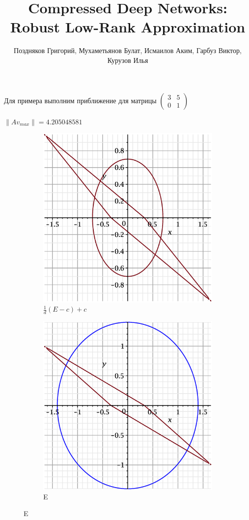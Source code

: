 \documentclass{beamer}
\title{Compressed Deep Networks: Robust Low-Rank Approximation}
\author{Поздняков Григорий, Мухаметьянов Булат, Исмаилов Аким, Гарбуз Виктор, Курузов Илья}
\begin{document}

\begin{frame}%
\titlepage
\end{frame}

\begin{frame}
Для примера выполним приближение для матрицы 
$\begin{pmatrix}
  3 & 5\\
  0 & 1
 \end{pmatrix}
$
\end{frame}

\begin{frame}
$\|Av_{max}\| = 4.205048581$  
    \begin{figure}
    \begin{subfigure}{.5\textwidth}
        \centering
        \includegraphics[width=.8\linewidth]{pictures/1.eps}
        \caption{$\displaystyle\frac{1}{d}(E-c)+c$}
    \label{fig:sfig1}
    \end{subfigure}%
    \begin{subfigure}{.5\textwidth}
        \centering
        \includegraphics[width=.8\linewidth]{pictures/1_1.eps}
        \caption{E}
    \label{fig:sfig2}
    \end{subfigure}
\end{figure}


\end{frame}
\end{document}
